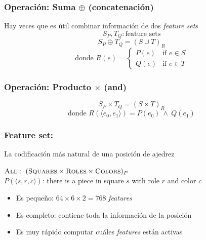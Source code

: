 \begin{frame}
\frametitle{Operación: Suma $\oplus$ (concatenación)}
Hay veces que es útil combinar información de dos \textit{feature sets} \\
\pause
\begin{equation*}
S_P, T_Q: \text{feature sets}
\end{equation*}
\begin{equation*}
S_P \oplus T_Q = {(S \cup T)}_R
\end{equation*}
\begin{equation*}
    \text{donde } R(e) = \begin{cases}
        P(e) & \text{if } e \in S \\
        Q(e) & \text{if } e \in T
    \end{cases}
\end{equation*}
\end{frame}

\begin{frame}
\frametitle{Operación: Producto $\times$ (and)}
\begin{equation*}
S_P \times T_Q = {(S \times T)}_{R}
\end{equation*}
\begin{equation*}
\text{donde } R(\langle e_0, e_1 \rangle) = P(e_0)\ \land\ Q(e_1)
\end{equation*}
\end{frame}

\begin{frame}
\frametitle{Feature set: }
La codificación más natural de una posición de ajedrez \\
\begin{center}
    $\textsc{All}:\ (\textsc{Squares} \times \textsc{Roles} \times \textsc{Colors})_{P}$ \\
    $P(\langle s, r, c \rangle)$: there is a piece in square $s$ with role $r$ and color $c$\\
\end{center}
\pause
\begin{itemize}
    \item<2-> Es pequeño: $64 \times 6 \times 2 = 768$ \textit{features}
    \item<3-> Es completo: contiene toda la información de la posición
    \item<4-> Es muy rápido computar cuáles \textit{features} están activas
\end{itemize}
\end{frame}

